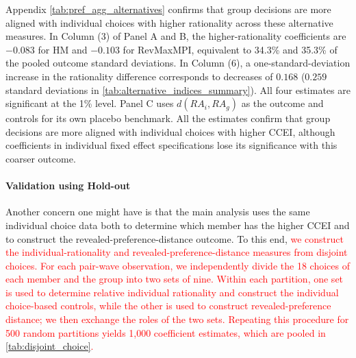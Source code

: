 \documentclass[11 pt]{article}
\begin{document}
Appendix \autoref{tab:pref_agg_alternatives} confirms that group decisions are more aligned with individual choices with higher rationality across these alternative measures. In Column (3) of Panel A and B, the higher-rationality coefficients are $-0.083$ for HM and $-0.103$ for RevMaxMPI, equivalent to 34.3\% and 35.3\% of the pooled outcome standard deviations. In Column (6), a one-standard-deviation increase in the rationality difference corresponds to decreases of $0.168$ ($0.259$ standard deviations in \autoref{tab:alternative_indices_summary}). All four estimates are significant at the 1\% level. Panel C uses $d(RA_i,RA_g)$ as the outcome and controls for its own placebo benchmark. All the estimates confirm that group decisions are more aligned with individual choices with higher CCEI, although coefficients in individual fixed effect specifications lose its significance with this coarser outcome.

\paragraph{Validation using Hold-out} Another concern one might have is that the main analysis uses the same individual choice data both to determine which member has the higher CCEI and to construct the revealed-preference-distance outcome. To this end, \textcolor{red}{we construct the individual-rationality and revealed-preference-distance measures from disjoint choices. For each pair-wave observation, we independently divide the 18 choices of each member and the group into two sets of nine. Within each partition, one set is used to determine relative individual rationality and construct the individual choice-based controls, while the other is used to construct revealed-preference distance; we then exchange the roles of the two sets. Repeating this procedure for 500 random partitions yields 1,000 coefficient estimates, which are pooled in \autoref{tab:disjoint_choice}.}
\end{document}
